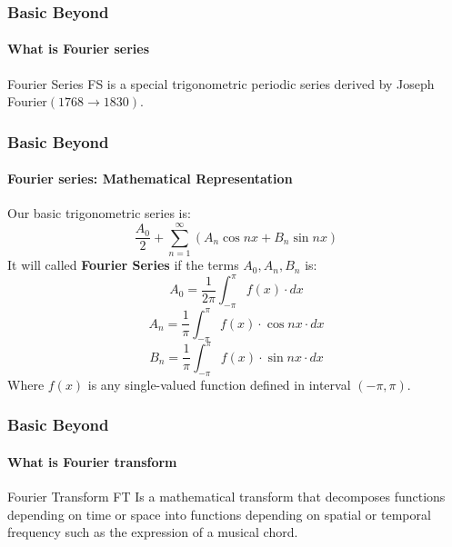 \documentclass[9 pt]{beamer}
\begin{document}
\begin{frame}
\frametitle{Basic Beyond}
\framesubtitle{What is Fourier series}
\begin{block}{Fourier Series}
FS is a special trigonometric periodic series derived by Joseph Fourier$(1768 \rightarrow 1830)$.
\end{block}

\end{frame}

\begin{frame}
\frametitle{Basic Beyond}
\framesubtitle{Fourier series: Mathematical Representation}

Our basic trigonometric series is:
$$\frac{A_0}{2} + \sum_{n=1}^{\infty} (A_n\cos nx + B_n\sin nx)$$
It will called \textbf{Fourier Series} if the terms $A_0, A_n, B_n$ is:
$$A_0 = \frac{1}{2\pi}\int_{-\pi}^{\pi} f(x)\cdot dx$$
$$A_n = \frac{1}{\pi}\int_{-\pi}^{\pi} f(x)\cdot \cos nx\cdot dx$$
$$B_n = \frac{1}{\pi}\int_{-\pi}^{\pi} f(x)\cdot \sin nx\cdot dx$$
Where \textbf{$f(x)$} is any single-valued function defined in interval $(-\pi, \pi)$.

\transfade[duration=0.6]
\end{frame}

\begin{frame}
\frametitle{Basic Beyond}
\framesubtitle{What is Fourier transform}

\begin{block}{Fourier Transform}
FT Is a mathematical transform that decomposes functions depending on time or space into functions depending on spatial or temporal frequency such as the expression of a musical chord.
\end{block}
\transwipe[duration=0.6]
\end{frame}
\end{document}
